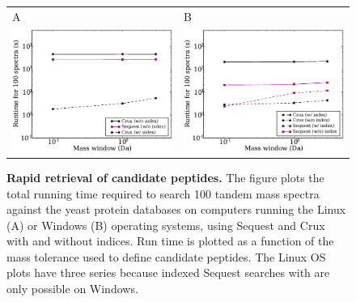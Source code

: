 \documentclass{article}
\begin{document}
\begin{figure}
  \centering
  \begin{tabular}{ll}
    {\sf A} & {\sf B} \\
  \includegraphics[width=2.5in]{../../results/paper-figure/index/indexing-yeast.eps} &
  \includegraphics[width=2.5in]{../../results/paper-figure/turbo-no-missed/indexing-yeast-windows.eps} \\

\end{tabular}
  \caption{{\bf Rapid retrieval of candidate peptides.}  The figure
  plots the total running time required to search 100 tandem mass
  spectra against the yeast protein databases
  on computers running the Linux ({\sf A}) 
  or Windows ({\sf B}) operating systems, using {\sc Sequest} and Crux with 
  and without indices.
  Run time is plotted 
  as a function of the mass tolerance used to define candidate
  peptides. The Linux OS plots have three series
  because indexed {\sc Sequest} searches with are only possible on Windows.
  \label{figure:indexing}}
\end{figure}



\end{document}
